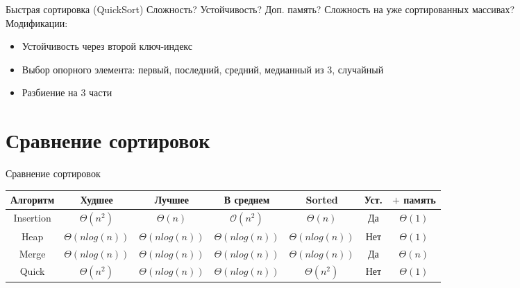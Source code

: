 \documentclass[10pt]{beamer}
\begin{document}
\begin{frame}[fragile]{Быстрая сортировка (QuickSort)}
Сложность? Устойчивость? Доп. память? Сложность на уже сортированных массивах?\\
Модификации:

\begin{itemize}
    \item Устойчивость через второй ключ-индекс
    \item Выбор опорного элемента: первый, последний, средний, медианный из 3, случайный
    \item Разбиение на 3 части
\end{itemize}
\end{frame}

\section{Сравнение сортировок}
\begin{frame}[fragile]{Сравнение сортировок}
\begin{table}
\small
\begin{tabular}{ |c|c|c|c|c|c|c|} 
 \hline
Алгоритм & Худшее & Лучшее & В среднем & Sorted & Уст. & $+$ память \\
 \hline
Insertion & $\Theta(n^2)$ & $\Theta(n)$ & $\mathcal{O}(n^2)$ & $\Theta(n)$ & Да &  $\Theta(1)$\\
 \hline
Heap & $\Theta(nlog(n))$ & $\Theta(nlog(n))$ & $\Theta(nlog(n))$ & $\Theta(nlog(n))$ & Нет &  $\Theta(1)$\\
 \hline
Merge & $\Theta(nlog(n))$ & $\Theta(nlog(n))$ & $\Theta(nlog(n))$ & $\Theta(nlog(n))$ & Да &  $\Theta(n)$\\
 \hline
Quick & $\Theta(n^2)$ & $\Theta(nlog(n))$ & $\Theta(nlog(n))$ & $\Theta(n^2)$ & Нет &  $\Theta(1)$\\
 \hline
\end{tabular}
\end{table}
\end{frame}
\end{document}
